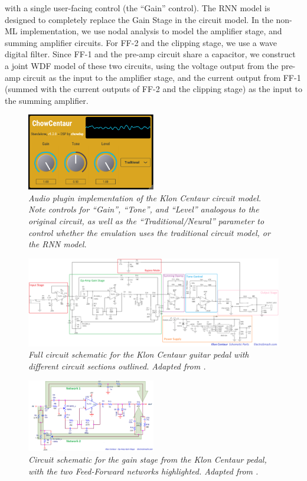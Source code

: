 \documentclass[twoside,a4paper]{article}
\begin{document}
with a single user-facing control (the ``Gain'' control). The RNN
model is designed to completely replace the Gain Stage in the circuit
model. In the non-ML implementation, we use nodal analysis to
model the amplifier stage, and summing amplifier circuits.
For FF-2 and the clipping stage, we use a wave digital filter.
Since FF-1 and the pre-amp circuit share a capacitor, we construct
a joint WDF model of these two circuits, using the voltage output
from the pre-amp circuit as the input to the amplifier stage, and
the current output from FF-1 (summed with the current outputs of
FF-2 and the clipping stage) as the input to the summing amplifier.
%
\begin{figure}
    \centering
    \includegraphics[width=0.5\textwidth]{Plugin.png}
    \caption{\label{fig:Plugin} {\it Audio plugin implementation
    of the Klon Centaur circuit model. Note controls for ``Gain'',
    ``Tone'', and ``Level'' analogous to the original circuit,
    as well as the ``Traditional/Neural'' parameter to control whether
    the emulation uses the traditional circuit model, or the RNN model.}}
\end{figure}
%
\begin{figure}
    \centering
    \includegraphics[width=1.0\textwidth]{FullCircuit.png}
    \caption{\label{fig:fullcircuit} {\it Full circuit schematic
    for the Klon Centaur guitar pedal with different circuit
    sections outlined. Adapted from \cite{electrosmash}.}}
\end{figure}
%
\begin{figure}
    \centering
    \includegraphics[width=0.5\textwidth]{GainStageCircuit.png}
    \caption{\label{fig:gaincircuit} {\it Circuit schematic for the
    gain stage from the Klon Centaur pedal, with the two Feed-Forward
    networks highlighted. Adapted from \cite{electrosmash}.}}
\end{figure}
\end{document}

